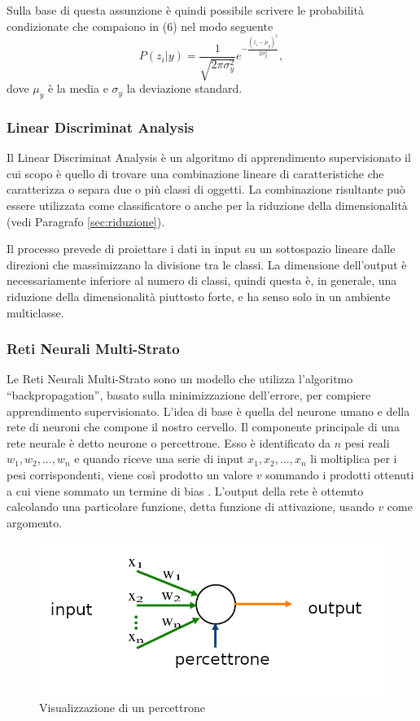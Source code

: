 \documentclass[12pt,italian]{report}
\begin{document}
Sulla base di questa assunzione è quindi possibile scrivere le probabilità condizionate che compaiono in (6) nel modo seguente
\begin{equation}
P(z_i|y) = \frac{1}{\sqrt{2\pi \sigma_y^2}} e^{-\frac{(z_i-\mu_y)^2}{2\sigma_y^2}},
\end{equation}
dove $\mu_y$ è la media e $\sigma_y$ la deviazione standard.
\subsubsection{Linear Discriminat Analysis}
Il Linear Discriminat Analysis è un algoritmo di apprendimento supervisionato il cui scopo è quello di trovare una combinazione lineare di caratteristiche che caratterizza o separa due o più classi di oggetti. La combinazione risultante può essere utilizzata come classificatore o anche per la riduzione della dimensionalità (vedi Paragrafo \ref{sec:riduzione}).

Il processo prevede di proiettare i dati in input su un sottospazio lineare dalle direzioni che massimizzano la divisione tra le classi. La dimensione dell'output è necessariamente inferiore al numero di classi, quindi questa è, in generale, una riduzione della dimensionalità piuttosto forte, e ha senso solo in un ambiente multiclasse.

\subsubsection{Reti Neurali Multi-Strato}
\label{MLP}
Le Reti Neurali Multi-Strato sono un modello che utilizza l'algoritmo ``backpropagation'', basato sulla minimizzazione dell'errore, per compiere apprendimento supervisionato. L'idea di base è quella del neurone umano e della rete di neuroni che compone il nostro cervello. Il componente principale di una rete neurale è detto neurone o percettrone. Esso è identificato da $n$ pesi reali $w_1, w_2,...,w_n$ e quando riceve una serie di input $x_1,x_2,...,x_n$ li moltiplica per i pesi corrispondenti, viene così prodotto un valore $v$ sommando i prodotti ottenuti a cui viene sommato un termine di bias \cite{multilayerPerceptron}.  L'output della rete è ottenuto calcolando una particolare funzione, detta funzione di attivazione, usando $v$ come argomento.

\begin{figure}[h]
	\centering
	\includegraphics[width = \textwidth]{immagini/Perceptron}
	\caption{Visualizzazione di un percettrone}
\end{figure}
\end{document}
